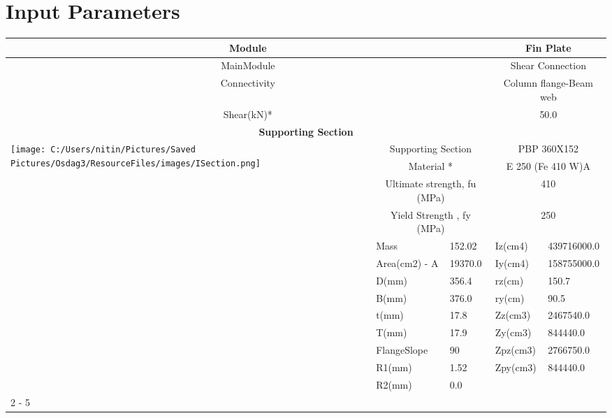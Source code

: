 \documentclass{article}%
\begin{document}
%
\normalsize%
\pagestyle{header}%
\section{Input Parameters}%
\label{sec:InputParameters}%
\renewcommand{\arraystretch}{1.2}%
\begin{longtable}{|p{5cm}|p{2cm}|p{2cm}|p{2cm}|p{5cm}|}%
\hline%
\hline%
\multicolumn{3}{|c|}{Module}&\multicolumn{2}{|c|}{Fin Plate}\\%
\hline%
\hline%
\multicolumn{3}{|c|}{MainModule}&\multicolumn{2}{|c|}{Shear Connection}\\%
\hline%
\hline%
\multicolumn{3}{|c|}{Connectivity}&\multicolumn{2}{|c|}{Column flange{-}Beam web}\\%
\hline%
\hline%
\multicolumn{3}{|c|}{Shear(kN)*}&\multicolumn{2}{|c|}{50.0}\\%
\hline%
\hline%
\multicolumn{5}{|c|}{\textbf{Supporting Section}}\\%
\hline%
\hline%
\multirow{13}{*}{\texttt{[image: C:/Users/nitin/Pictures/Saved Pictures/Osdag3/ResourceFiles/images/ISection.png]}}&\multicolumn{2}{|c|}{Supporting Section}&\multicolumn{2}{|c|}{PBP 360X152}\\%
\cline{2%
-%
5}%
&\multicolumn{2}{|c|}{Material *}&\multicolumn{2}{|c|}{E 250 (Fe 410 W)A}\\%
\cline{2%
-%
5}%
&\multicolumn{2}{|c|}{Ultimate strength, fu (MPa)}&\multicolumn{2}{|c|}{410}\\%
\cline{2%
-%
5}%
&\multicolumn{2}{|c|}{Yield Strength , fy (MPa)}&\multicolumn{2}{|c|}{250}\\%
\cline{2%
-%
5}%
&Mass&152.02&Iz(cm4)&439716000.0\\%
\cline{2%
-%
5}%
&Area(cm2) {-} A&19370.0&Iy(cm4)&158755000.0\\%
\cline{2%
-%
5}%
&D(mm)&356.4&rz(cm)&150.7\\%
\cline{2%
-%
5}%
&B(mm)&376.0&ry(cm)&90.5\\%
\cline{2%
-%
5}%
&t(mm)&17.8&Zz(cm3)&2467540.0\\%
\cline{2%
-%
5}%
&T(mm)&17.9&Zy(cm3)&844440.0\\%
\cline{2%
-%
5}%
&FlangeSlope&90&Zpz(cm3)&2766750.0\\%
\cline{2%
-%
5}%
&R1(mm)&1.52&Zpy(cm3)&844440.0\\%
\cline{2%
-%
5}%
&R2(mm)&0.0&&\\%
\cline{2%
-%
5}%
\hline%
\multicolumn{5}{|c|}{\textbf{Supported Section}}\\%

\end{longtable}
\end{document}
